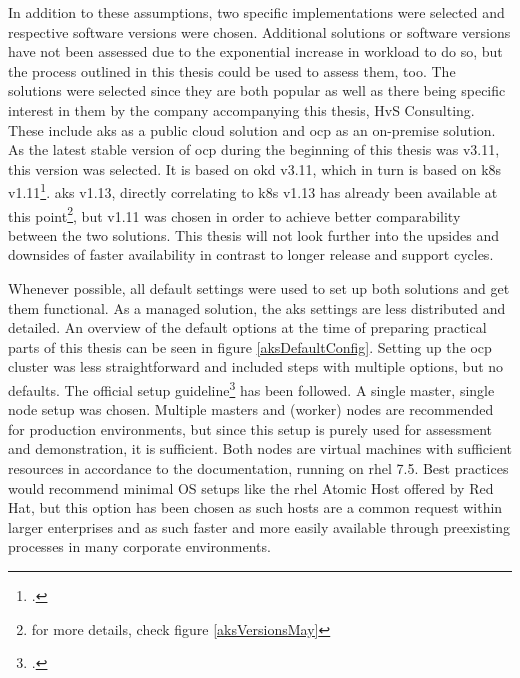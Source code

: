 In addition to these assumptions, two specific implementations were selected and respective software versions were chosen. Additional solutions or software versions have not been assessed due to the exponential increase in workload to do so, but the process outlined in this thesis could be used to assess them, too.
The solutions were selected since they are both popular as well as there being specific interest in them by the company accompanying this thesis, HvS Consulting.
These include \gls{aks} as a public cloud solution and \gls{ocp} as an on-premise solution. As the latest stable version of \gls{ocp} during the beginning of this thesis was v3.11, this version was selected. It is based on \gls{okd} v3.11, which in turn is based on \gls{k8s} v1.11\footcite[][, refer to the second table below the headline 'Platform Components']{ocpK8sVersions}. \gls{aks} v1.13, directly correlating to \gls{k8s} v1.13 has already been available at this point\footnote{for more details, check figure \ref{aksVersionsMay}}, but v1.11 was chosen in order to achieve better comparability between the two solutions. This thesis will not look further into the upsides and downsides of faster availability in contrast to longer release and support cycles.

Whenever possible, all default settings were used to set up both solutions and get them functional. 
As a managed solution, the \gls{aks} settings are less distributed and detailed. An overview of the default options at the time of preparing practical parts of this thesis can be seen in figure \ref{aksDefaultConfig}.
Setting up the \gls{ocp} cluster was less straightforward and included steps with multiple options, but no defaults. The official setup guideline\footcite[][, sections 'Planning your installation' to 'Installing OpenShift']{ocpSetup} has been followed. A single master, single node setup was chosen. Multiple masters and (worker) nodes are recommended for production environments, but since this setup is purely used for assessment and demonstration, it is sufficient. Both nodes are virtual machines with sufficient resources in accordance to the documentation, running on \gls{rhel} 7.5. Best practices would recommend minimal OS setups like the \gls{rhel} Atomic Host offered by Red Hat, but this option has been chosen as such hosts are a common request within larger enterprises and as such faster and more easily available through preexisting processes in many corporate environments.


